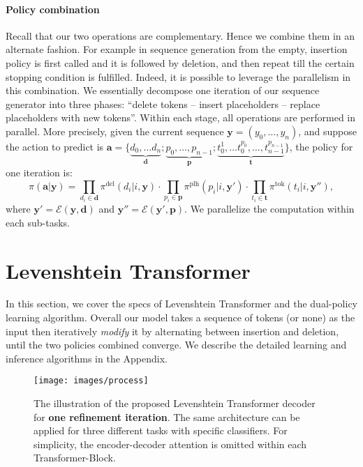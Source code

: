 \documentclass{article}
\begin{document}
\paragraph{Policy combination}
Recall that our two operations are complementary. Hence we combine them in an alternate fashion. For example in sequence generation from the empty, insertion policy is first called and it is followed by deletion, and then repeat till the certain stopping condition is fulfilled.
Indeed, it is possible to leverage the parallelism in this combination. We essentially decompose one iteration of our sequence generator into three phases: ``delete tokens -- insert placeholders -- replace placeholders with new tokens''. Within each stage, all operations are performed in parallel. More precisely, given the current sequence $\bm{y}=(y_0, \ldots, y_{n})$, and suppose the action to predict is $\bm{a} = \{\underbrace{d_0,\ldots d_{n}}_{\bm{d}}; \underbrace{p_0, \ldots, p_{n-1}}_{\bm{p}}; \underbrace{t_0^1, \ldots t_0^{p_0}, \ldots, t_{n-1}^{p_{n-1}}}_{\bm{t}}\}$, the policy for one iteration is:
\begin{equation}
    \pi(\bm{a}| \bm{y}) = \prod_{d_i\in \bm{d}} \pi^\textrm{del}(d_i |i, \bm{y})\cdot \prod_{p_i \in \bm{p}} \pi^\textrm{plh}(p_i |i, \bm{y}') \cdot \prod_{t_i \in \bm{t}} \pi^\textrm{tok}(t_i | i, \bm{y}''),
\end{equation}
where $\bm{y}'=\mathcal{E}(\bm{y}, \bm{d})$ and $\bm{y}''=\mathcal{E}(\bm{y}', \bm{p})$. We parallelize the computation within each sub-tasks.




\section{Levenshtein Transformer}
In this section, we cover the specs of Levenshtein Transformer and the dual-policy learning algorithm.
Overall our model takes a sequence of tokens (or none) as the input then iteratively \emph{modify} it by alternating between insertion and deletion, until the two policies combined converge. We describe the detailed learning and inference algorithms in the Appendix.





\begin{figure}
    \centering
\texttt{[image: images/process]}
\caption{The illustration of the proposed Levenshtein Transformer decoder for \textbf{one refinement iteration}. The same architecture can be applied for three different tasks with specific classifiers. For simplicity, the encoder-decoder attention is omitted within each Transformer-Block.}
    \label{fig:process}
\end{figure}
\end{document}
